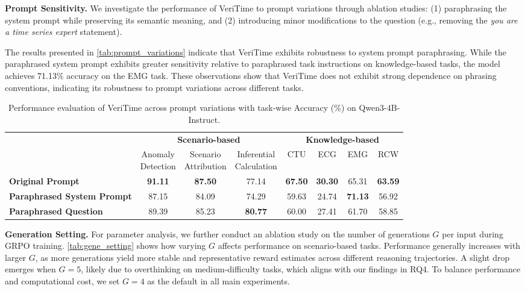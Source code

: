 \documentclass{article}
\theoremstyle{plain}
\theoremstyle{definition}
\theoremstyle{remark}
\begin{document}
\textbf{Prompt Sensitivity.} We investigate the performance of VeriTime to prompt variations through ablation studies: (1) paraphrasing the system prompt while preserving its semantic meaning, and (2) introducing minor modifications to the question (e.g., removing the \textit{you are a time series expert} statement). 

The results presented in \autoref{tab:prompt_variations} indicate that VeriTime exhibits robustness to system prompt paraphrasing. While the paraphrased system prompt exhibits greater sensitivity relative to paraphrased task instructions on knowledge-based tasks, the model achieves 71.13\% accuracy on the EMG task. These observations show that VeriTime does not exhibit strong dependence on phrasing conventions, indicating its robustness to prompt variations across different tasks.


\begin{table}[htbp]
\centering
\small
\caption{Performance evaluation of VeriTime across prompt variations with task-wise Accuracy (\%) on Qwen3-4B-Instruct.}
\label{tab:prompt_variations}
\setlength{\tabcolsep}{3pt}
\begin{tabular}{lccccccc}
\toprule
& \multicolumn{3}{c}{\textbf{Scenario-based}} & \multicolumn{4}{c}{\textbf{Knowledge-based}} \\
\cmidrule(lr){2-4} \cmidrule(lr){5-8}
 & \makecell{Anomaly \\ Detection} & \makecell{Scenario \\ Attribution} & \makecell{Inferential \\ Calculation} & CTU & ECG & EMG & RCW \\
\midrule
\textbf{Original Prompt} & \textbf{91.11} & \textbf{87.50} & 77.14 & \textbf{67.50} & \textbf{30.30} & 65.31 & \textbf{63.59} \\
\textbf{Paraphrased System Prompt} & 87.15 & 84.09 & 74.29 & 59.63 & 24.74 & \textbf{71.13} & 56.92 \\
\textbf{Paraphrased Question} & 89.39 & 85.23 & \textbf{80.77} & 60.00 & 27.41 & 61.70 & 58.85 \\
\bottomrule
\end{tabular}
\end{table}

\textbf{Generation Setting.} For parameter analysis, we further conduct an ablation study on the number of generations \(G\) per input during GRPO training. \autoref{tab:gene_setting} shows how varying \(G\) affects performance on scenario-based tasks. Performance generally increases with larger \(G\), as more generations yield more stable and representative reward estimates across different reasoning trajectories. A slight drop emerges when \(G = 5\), likely due to overthinking on medium-difficulty tasks, which aligns with our findings in RQ4. To balance performance and computational cost, we set \(G = 4\) as the default in all main experiments. 
\end{document}
